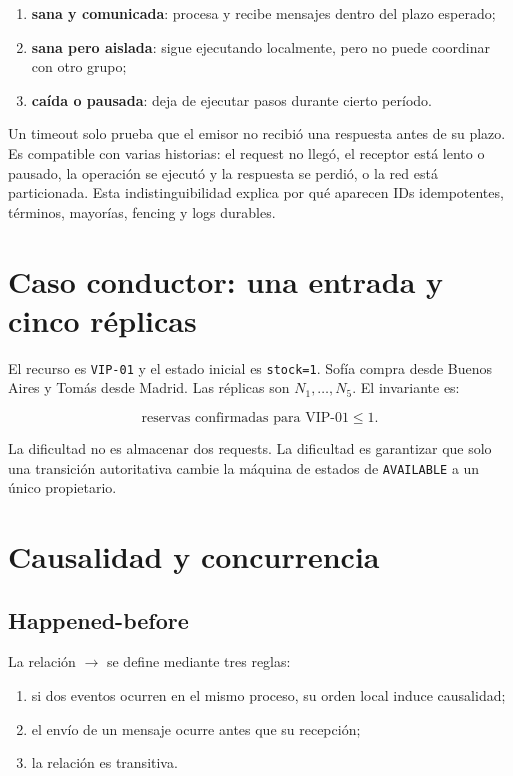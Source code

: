 \documentclass[variant=apuntes,cover=institutional,mode=screen]{ua-engineering-v6-article}
\begin{document}
\begin{enumerate}
\item \textbf{sana y comunicada}: procesa y recibe mensajes dentro del plazo esperado;
\item \textbf{sana pero aislada}: sigue ejecutando localmente, pero no puede coordinar con otro grupo;
\item \textbf{caída o pausada}: deja de ejecutar pasos durante cierto período.
\end{enumerate}

Un timeout solo prueba que el emisor no recibió una respuesta antes de su plazo. Es compatible con varias historias: el request no llegó, el receptor está lento o pausado, la operación se ejecutó y la respuesta se perdió, o la red está particionada. Esta indistinguibilidad explica por qué aparecen IDs idempotentes, términos, mayorías, fencing y logs durables.

\section{Caso conductor: una entrada y cinco réplicas}

El recurso es \texttt{VIP-01} y el estado inicial es \texttt{stock=1}. Sofía compra desde Buenos Aires y Tomás desde Madrid. Las réplicas son \(N_1,\ldots,N_5\). El invariante es:

\[
\text{reservas confirmadas para VIP-01}\leq 1.
\]

La dificultad no es almacenar dos requests. La dificultad es garantizar que solo una transición autoritativa cambie la máquina de estados de \texttt{AVAILABLE} a un único propietario.

\section{Causalidad y concurrencia}

\subsection{Happened-before}

La relación \(\rightarrow\) se define mediante tres reglas:

\begin{enumerate}
\item si dos eventos ocurren en el mismo proceso, su orden local induce causalidad;
\item el envío de un mensaje ocurre antes que su recepción;
\item la relación es transitiva.
\end{enumerate}
\end{document}
